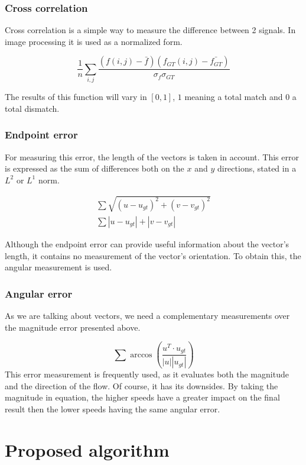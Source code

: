 \documentclass[12pt,a4paper,twoside]{report}
\begin{document}
{\subsection{Cross correlation}

Cross correlation is a simple way to measure the difference between 2 signals. In image processing it is used as a normalized form. 

\begin{equation}
\frac{1}{n}\sum_{i,j} \frac{(f(i,j) - \bar{f})(f_{GT}(i,j) - \bar{f_{GT}})}{\sigma_f \sigma_{GT}}
\end{equation}


The results of this function will vary in $[0,1]$, $1$ meaning a total match and $0$ a total dismatch.
\subsection{Endpoint error}
For measuring this error, the length of the vectors is taken in account. This error is expressed as the sum of differences both on the $x$ and $y$ directions, stated in a $L^2$ or $L^1$ norm.

\begin{equation}
\begin{split}
\sum  \sqrt{(u-u_{gt})^2+(v-v_{gt})^2} \\ 
\sum |u-u_{gt}|+|v-v_{gt}|
\end{split}
\end{equation}

Although the endpoint error can provide useful information about the vector's length, it contains no measurement of  the vector's orientation. To obtain this, the angular measurement is used.
\subsection{Angular error}
As we are talking about vectors, we need a complementary measurements over the magnitude error presented above.


\begin{equation}
\sum  \arccos \left( \frac{u^T \cdot u_{gt}}{|u||u_{gt}|}\right)
\end{equation}
 This error measurement is frequently used, as it evaluates both the magnitude and the direction of the flow. Of course, it has its downsides. By taking the magnitude in equation, the higher speeds have a greater impact on the final result then the lower speeds having the same angular error. 

\chapter{Proposed algorithm}

}
\end{document}
